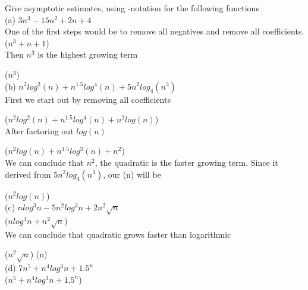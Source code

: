 \documentclass[11pt]{article}
\newcounter{prnum}
\newenvironment{problem}{{\vskip 0.2in\noindent\bf Problem
       \addtocounter{prnum}{1} \arabic{prnum}.}}{\vskip 0.1in}
\begin{document}
\begin{problem}
    Give asymptotic estimates, using \Theta-notation for the following functions\\
   
    \noindent(a) $3n^3 - 15n^2 + 2n +4$\\

    One of the first steps would be to remove all negatives and remove all coefficients. \\

     \Theta ($n^3 + n + 1$)
     \\

     Then $n^3$ is the highest growing term
     \smallskip

     \Theta($n^3$) \\

   \noindent(b) $n^2 log^2(n) + n^{1.5} log^4 (n) + 5n^2 log_4 (n^3)$  \\

   First we start out by removing all coefficients 
   \smallskip

   \Theta($n^2 log^2(n) + n^{1.5} log^4 (n) + n^2 log(n)$) 
      \\

      After factoring out $log(n)$
      \smallskip

   \Theta($n^2 log(n) + n^{1.5} log^3 (n) + n^2 $)  \\

   We can conclude that $n^2$, the quadratic is the faster growing term.
   Since it derived from $5n^2log_4(n^3)$, our \Theta(n) will be 
   \smallskip

   \Theta($n^2log(n)$) \\



    \noindent(c) $nlog^3n - 5n^2 log^3 n + 2n^2 \sqrt n$  \\

      \Theta ($nlog^3n + n^2 \sqrt n$)
      \\

      We can conclude that quadratic grows faster than logarithmic
      \smallskip

      \Theta($n^2 \sqrt n$) \to \Theta(n) \\

    \noindent(d) 7\cdot $n^5 + n^4 log^3 n + 1.5^n  $ \\

      \Theta($n^5 + n^4 log^3 n + 1.5^n $) 
    \\


\end{problem}
\end{document}
